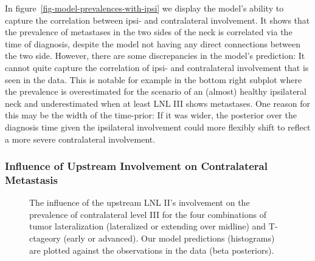\documentclass[
  sn-mathphys-num,
]{sn-jnl}
\begin{document}
In figure~\ref{fig-model-prevalences-with-ipsi} we display the model's
ability to capture the correlation between ipsi- and contralateral
involvement. It shows that the prevalence of metastases in the two sides
of the neck is correlated via the time of diagnosis, despite the model
not having any direct connections between the two side. However, there
are some discrepancies in the model's prediction: It cannot quite
capture the correlation of ipsi- and contralateral involvement that is
seen in the data. This is notable for example in the bottom right
subplot where the prevalence is overestimated for the scenario of an
(almost) healthy ipsilateral neck and underestimated when at least LNL
III shows metastases. One reason for this may be the width of the
time-prior: If it was wider, the posterior over the diagnosis time given
the ipsilateral involvement could more flexibly shift to reflect a more
severe contralateral involvement.

\subsubsection{Influence of Upstream Involvement on Contralateral
Metastasis}\label{influence-of-upstream-involvement-on-contralateral-metastasis}

\begin{figure}


\caption{\label{fig-model-prevalences-upstream}The influence of the
upstream LNL II's involvement on the prevalence of contralateral level
III for the four combinations of tumor lateralization (lateralized or
extending over midline) and T-ctageory (early or advanced). Our model
predictions (histograms) are plotted against the observations in the
data (beta posteriors).}

\end{figure}%
\end{document}
